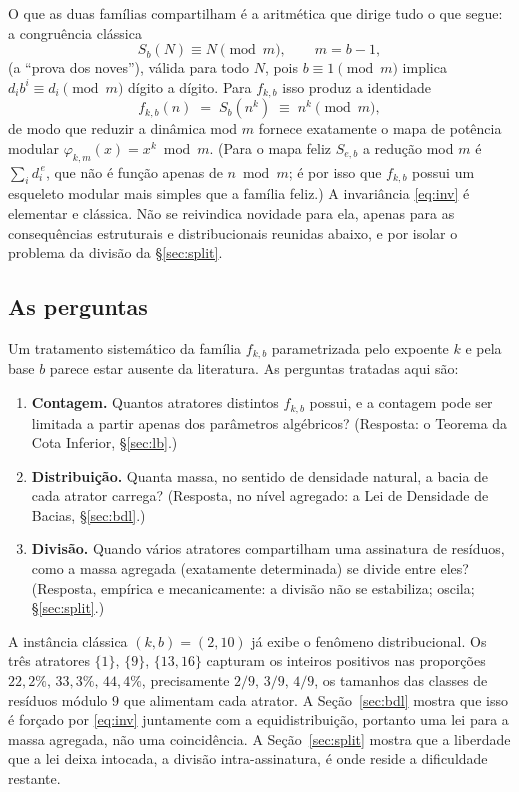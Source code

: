 \documentclass[11pt]{article}
\theoremstyle{definition}
\theoremstyle{remark}
\begin{document}
O que as duas famílias compartilham é a aritmética que dirige tudo o que segue: a congruência clássica
\begin{equation}\label{eq:co9}
S_b(N) \equiv N \pmod{m}, \qquad m = b-1,
\end{equation}
(a ``prova dos noves''), válida para todo $N$, pois $b \equiv 1 \pmod{m}$ implica $d_i b^i \equiv d_i \pmod m$ dígito a dígito. Para $f_{k,b}$ isso produz a identidade
\begin{equation}\label{eq:inv}
f_{k,b}(n) \;=\; S_b(n^k) \;\equiv\; n^k \pmod{m},
\end{equation}
de modo que reduzir a dinâmica mod $m$ fornece exatamente o mapa de potência modular $\varphi_{k,m}(x) = x^k \bmod m$. (Para o mapa feliz $S_{e,b}$ a redução mod $m$ é $\sum_i d_i^{\,e}$, que não é função apenas de $n \bmod m$; é por isso que $f_{k,b}$ possui um esqueleto modular mais simples que a família feliz.) A invariância \eqref{eq:inv} é elementar e clássica. Não se reivindica novidade para ela, apenas para as consequências estruturais e distribucionais reunidas abaixo, e por isolar o problema da divisão da \S\ref{sec:split}.

\subsection{As perguntas}

Um tratamento sistemático da família $f_{k,b}$ parametrizada pelo expoente $k$ e pela base $b$ parece estar ausente da literatura. As perguntas tratadas aqui são:
\begin{enumerate}
\item \textbf{Contagem.} Quantos atratores distintos $f_{k,b}$ possui, e a contagem pode ser limitada a partir apenas dos parâmetros algébricos? (Resposta: o Teorema da Cota Inferior, \S\ref{sec:lb}.)
\item \textbf{Distribuição.} Quanta massa, no sentido de densidade natural, a bacia de cada atrator carrega? (Resposta, no nível agregado: a Lei de Densidade de Bacias, \S\ref{sec:bdl}.)
\item \textbf{Divisão.} Quando vários atratores compartilham uma assinatura de resíduos, como a massa agregada (exatamente determinada) se divide entre eles? (Resposta, empírica e mecanicamente: a divisão não se estabiliza; oscila; \S\ref{sec:split}.)
\end{enumerate}

A instância clássica $(k,b) = (2,10)$ já exibe o fenômeno distribucional. Os três atratores $\{1\}$, $\{9\}$, $\{13,16\}$ capturam os inteiros positivos nas proporções $22{,}2\%,\,33{,}3\%,\,44{,}4\%$, precisamente $2/9,\,3/9,\,4/9$, os tamanhos das classes de resíduos módulo $9$ que alimentam cada atrator. A Seção~\ref{sec:bdl} mostra que isso é forçado por \eqref{eq:inv} juntamente com a equidistribuição, portanto uma lei para a massa agregada, não uma coincidência. A Seção~\ref{sec:split} mostra que a liberdade que a lei deixa intocada, a divisão intra-assinatura, é onde reside a dificuldade restante.
\end{document}
